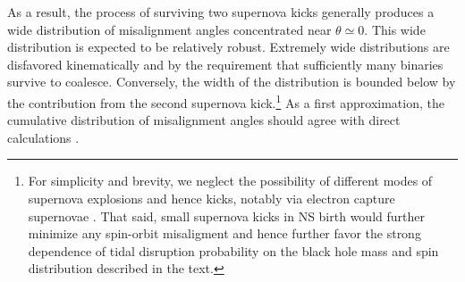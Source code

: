 \documentclass[nofootinbib,twocolumn,prd]{emulateapj}
\begin{document}
As a result, the process of surviving two supernova kicks generally produces a wide  distribution of misalignment
angles concentrated near $\theta\simeq 0$.  This wide distribution is expected to be relatively robust.  Extremely wide
distributions are disfavored kinematically and by the requirement that sufficiently many binaries survive to coalesce.
Conversely, the width of the distribution is bounded below by the contribution from the second supernova kick.\footnote{For simplicity and brevity, we neglect the
  possibility of different modes of supernova explosions and hence kicks, notably via electron capture supernovae \citep{2012ARNPS..62..407J,2004ApJ...612.1044P,2010MNRAS.406..656K,2015ApJ...801...32A}.  That said, small supernova kicks in NS
  birth would further minimize any spin-orbit misaligment and hence further favor the strong dependence of tidal disruption probability on the black hole mass and spin
  distribution described in the text.} 
As a first approximation,  the cumulative distribution of misalignment angles should agree with direct calculations \cite{2010ApJ...719L..79F,2008ApJ...682..474B,2004PhRvD..69j2002G}.



\end{document}

